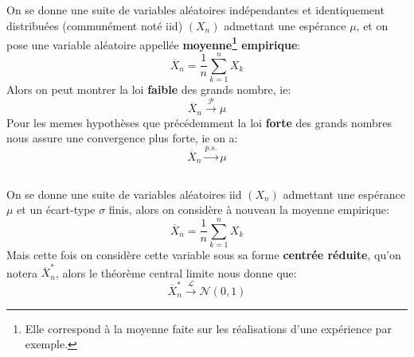\subsection*{}
On se donne une suite de variables aléatoires indépendantes et identiquement distribuées (communément noté iid) \((X_n)\) admettant une espérance \(\mu\), et on pose une variable aléatoire appellée \textbf{moyenne\footnote[1]{Elle correspond à la moyenne faite sur les réalisations d'une expérience par exemple.} empirique}:
\[
   \overline{X}_n = \frac{1}{n}\sum_{k=1}^{n}X_k   
\]
Alors on peut montrer la loi \textbf{faible} des grands nombre, ie:
\[
   \overline{X}_n \overset{\mathcal{P}}{\longrightarrow} \mu
\]
Pour les memes hypothèses que précédemment la loi \textbf{forte} des grands nombres nous assure une convergence plus forte, ie on a:
\[
   \overline{X}_n \overset{p.s.}{\longrightarrow} \mu
\]

\subsection*{}
On se donne une suite de variables aléatoires iid \((X_n)\) admettant une espérance \(\mu\) et un écart-type \(\sigma\) finis, alors on considère à nouveau la moyenne empirique:
\[
   \overline{X}_n = \frac{1}{n}\sum_{k=1}^{n}X_k   
\]
Mais cette fois on considère cette variable sous sa forme \textbf{centrée réduite}, qu'on notera \(\overline{X}_n^*\), alors le théorème central limite nous donne que:
\[
   \overline{X}_n^* \overset{\mathcal{L}}{\longrightarrow} \mathcal{N}(0, 1)
\]